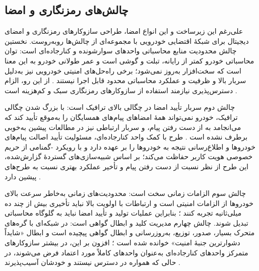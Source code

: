 \documentclass[12pt,a4paper]{article}
\begin{document}
\subsection{چالش‌های رمزنگاری و امضا}

علی‌رغم این زیرساخت و این انواع امضا، طراحی سازوکار‌های رمزنگاری و امضای دیجیتال برای شبکهٔ اقتضایی خودرویی با مجموعه‌ای از چالش‌ها روبه‌روست. نخستین چالش محدودیت منابع محاسباتی واحد‌های سوارشونده و کنارجاده‌ای است: توان محاسباتی خودرو کمتر از رایانه، تبلت و گوشی است و عمر طولانی خودرو به این معنا است که سخت‌افزار به‌روز نمی‌شود؛ برخی راه‌حل‌های امنیتی خودرویی نیز به‌دلیل سربار بالا و ظرفیت و عملکرد محاسباتی محدود قابل اجرا نیستند \cite{farsimadanReviewSecurityChallenges2025}. از این رو، الزام دسترس‌پذیری نیازمند استفاده از سازوکار‌های رمزنگاری سبک و کم‌هزینه است \cite{farsimadanReviewSecurityChallenges2025}.

چالش دوم سربار تأیید امضا در چگالی بالای ترافیک است: با بزرگ شدن چگالی ترافیک، خودرو نمی‌تواند همهٔ امضا‌های پیام‌های همسایگان را به‌موقع تأیید کند که می‌انجامد به از دست رفتن پیام، و سربار ارتباطی نیز در مطالعات پیشین به‌خوبی برطرف نشده است \cite{zhangRAISEEfficientRSUAided2008}. طرح  با کمک واحد کنارجاده‌ای، مسئولیت تأیید اصالت پیام‌های خودرو‌ها و اطلاع‌رسانی نتیجه به خودرو‌ها را بر عهده دارد و با رویکرد -گمنامی از حریم خصوصی هویت کاربر حفاظت می‌کند؛ بر اساس شبیه‌سازی‌های گستردهٔ گزارش‌شده، این طرح از نظر نسبت از دست رفتن پیام و تأخیر عملکرد بهتری نسبت به طرح‌های پیشین دارد \cite{zhangRAISEEfficientRSUAided2008}.

چالش سوم الزامات زمانی سخت است: محدودیت‌های زمانی به‌خاطر سرعت بالای خودرو‌ها از الزامات امنیتی است \cite{SecuringVehicularAd} و ارتباطات با اولویت بالا نباید تأخیری بیش از چند ده میلی‌ثانیه تجربه کنند \cite{farsimadanReviewSecurityChallenges2025}؛ بنابراین عملیات تولید و تأیید امضا نباید به گلوگاه محاسباتی تبدیل شوند. چالش چهارم مدیریت کلید و ابطال گواهی است: در شبکه‌ای با گره‌های متحرک بسیار، صدور، توزیع، به‌روزرسانی و ابطال گواهی پیچیده است و ابطال «شایداً دشوارترین جنبهٔ امنیت» خوانده شده است \cite{SecuringVehicularAd}؛ افزون بر این، در بیشتر سازوکار‌های متمرکز واحد‌های کنارجاده‌ای به‌عنوان واحد‌های کاملاً مورد اعتماد فرض می‌شوند، در حالی که همواره در دسترس نیستند و خودشان آسیب‌پذیرند \cite{farsimadanReviewSecurityChallenges2025}.
\end{document}

